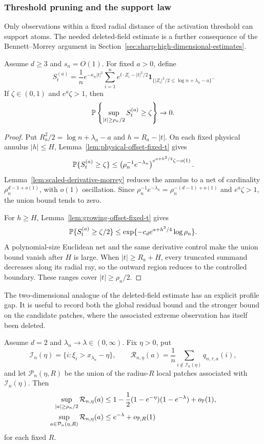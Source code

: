 \subsubsection{Threshold pruning and the support law}

Only observations within a fixed radial distance of the activation threshold
can support atoms. The needed deleted-field estimate is a further consequence
of the Bennett--Morrey argument in
Section~\ref{sec:sharp-high-dimensional-estimates}.
\begin{lemma}
\label{lem:support-dge3-deleted-field}
Assume \(d\ge3\) and \(s_n=O(1)\). For fixed \(a>0\), define
\[
 S_t^{(a)}=\frac1n e^{-\kappa_n|t|^2}
 \sum_{i=1}^ne^{t\cdot Z_i-|t|^2/2}
 \mathbf1_{\{|Z_i|^2/2\le\log n+\lambda_n-a\}}.
\]
If \(\zeta\in(0,1)\) and \(e^a\zeta>1\), then
\[
    \mathbb P\left\{\sup_{|t|\ge\rho_n/2}S_t^{(a)}\ge\zeta\right\}\to0.
\]
\end{lemma}

\begin{proof}
Put \(R_a^2/2=\log n+\lambda_n-a\) and
\(h=R_a-|t|\). On each fixed physical annulus \(|h|\le H\),
Lemma~\ref{lem:physical-offset-fixed-t} gives
\[
 \mathbb P\{S_t^{(a)}\ge\zeta\}
 \le\left(\rho_n^{-1}e^{-\lambda_n}\right)^{
     e^{a+h^2/2}\zeta-o(1)}.
\]
Lemma~\ref{lem:scaled-derivative-morrey} reduces the annulus to a net of
cardinality \(\rho_n^{d-1+o(1)}\), with \(o(1)\) oscillation. Since
\(\rho_n^{-1}e^{-\lambda_n}=\rho_n^{-(d-1)+o(1)}\) and
\(e^a\zeta>1\), the union bound tends to zero.

For \(h\ge H\), Lemma~\ref{lem:growing-offset-fixed-t} gives
\[
 \mathbb P\{S_t^{(a)}\ge\zeta/2\}
 \le\exp\{-c_de^{a+h^2/4}\log\rho_n\}.
\]
A polynomial-size Euclidean net and the same derivative control make the
union bound vanish after \(H\) is large. When \(|t|\ge R_a+H\), every
truncated summand decreases along its radial ray, so the outward region reduces
to the controlled boundary. These ranges cover \(|t|\ge\rho_n/2\).
\end{proof}

The two-dimensional analogue of the deleted-field estimate has an explicit
profile gap.  It is useful to record both the global residual bound and the
stronger bound on the candidate patches, where the associated extreme
observation has itself been deleted.
\begin{lemma}
\label{lem:support-d2-residual-gap}
Assume \(d=2\) and \(\lambda_n\to\lambda\in(0,\infty)\).  Fix \(\eta>0\),
put
\[
 \mathcal I_n(\eta)=\{i:\xi_i>x_{\lambda_n}-\eta\},
 \qquad
 \mathcal R_{n,\eta}(a)
 =\frac1n\sum_{i\notin\mathcal I_n(\eta)}q_{n,\tau,a}(i),
\]
and let \(\mathcal P_n(\eta,R)\) be the union of the radius-\(R\) local
patches associated with \(\mathcal I_n(\eta)\).  Then
\begin{align}
\label{eq:support-d2-global-residual-gap}
 \sup_{|a|\ge\rho_n/2}\mathcal R_{n,\eta}(a)
 &\le1-\frac12(1-e^{-\eta})(1-e^{-\lambda})+o_{\mathbb P}(1),\\
\label{eq:support-d2-candidate-residual-gap}
 \sup_{a\in\mathcal P_n(\eta,R)}\mathcal R_{n,\eta}(a)
 &\le e^{-\lambda}+o_{\mathbb P,R}(1)
\end{align}
for each fixed \(R\).
\end{lemma}

